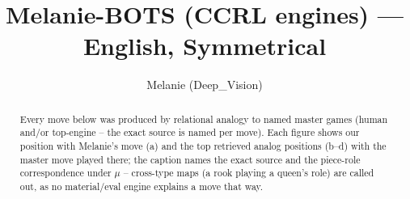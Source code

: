 \documentclass[11pt]{article}
\title{Melanie-BOTS (CCRL engines) — English, Symmetrical}
\author{Melanie (Deep\_Vision)}
\date{}
\begin{document}
\maketitle

\begin{abstract}Every move below was produced by relational analogy to named master games (human and/or top-engine -- the exact source is named per move). Each figure shows our position with Melanie's move (a) and the top retrieved analog positions (b--d) with the master move played there; the caption names the exact source and the piece-role correspondence under $\mu$ -- cross-type maps (a rook playing a queen's role) are called out, as no material/eval engine explains a move that way.\end{abstract}

\begin{figure}[p]\centering
\begin{subfigure}{0.46\textwidth}\centering
\resizebox{\linewidth}{!}{%
\newchessgame
\chessboard[
  setfen={r1bq1rk1/pp1pppbp/2n2np1/2p5/2P5/2N2NP1/PP1PPPBP/R1BQ1RK1 w - - 4 7},
  showmover=false,
  pgfstyle=straightmove, color=movearrow, markmove={a2-a3}
]}
\caption{}
\end{subfigure}\hfill
\begin{subfigure}{0.46\textwidth}\centering
\resizebox{\linewidth}{!}{%
\newchessgame
\chessboard[
  setfen={r1bq1rk1/ppppppbp/2n2np1/8/2P5/2N2NP1/PP1PPPBP/R1BQ1RK1 b - - 6 6},
  showmover=false,
  pgfstyle=straightmove, color=movearrow, markmove={a7-a6}
]}
\caption{}
\end{subfigure}
\\[4pt]
\begin{subfigure}{0.46\textwidth}\centering
\resizebox{\linewidth}{!}{%
\newchessgame
\chessboard[
  setfen={r1bq1rk1/ppppppbp/2n2np1/8/2P5/2N2NP1/PP1PPPBP/R1BQ1RK1 b - - 6 6},
  showmover=false,
  pgfstyle=straightmove, color=movearrow, markmove={a7-a6}
]}
\caption{}
\end{subfigure}\hfill
\begin{subfigure}{0.46\textwidth}\centering
\resizebox{\linewidth}{!}{%
\newchessgame
\chessboard[
  setfen={r1bq1rk1/ppppppbp/2n2np1/8/2P5/2N2NP1/PP1PPPBP/R1BQ1RK1 b - - 6 6},
  showmover=false,
  pgfstyle=straightmove, color=movearrow, markmove={a7-a6}
]}
\caption{}
\end{subfigure}

\end{figure}
\end{document}
